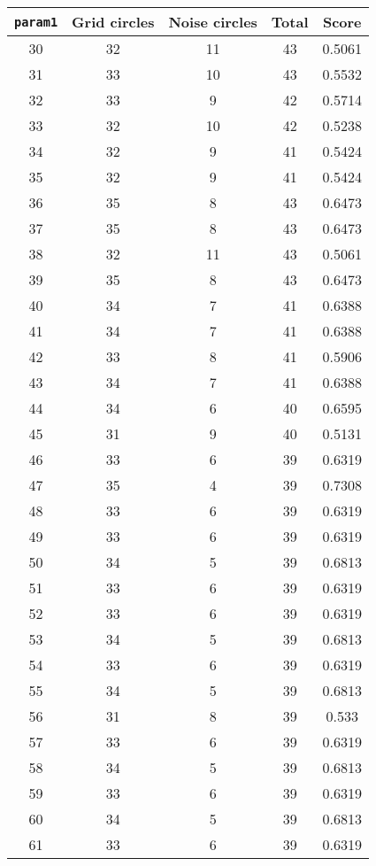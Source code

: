 \documentclass[letterpaper, 12pt]{article}
\begin{document}
\begin{longtable}{|c|c|c|c|c|}
\hline
\textbf{\texttt{param1}} & \textbf{Grid circles} & \textbf{Noise circles} & \textbf{Total} & \textbf{Score} \\
\hline
30 & 32 & 11 & 43 & 0.5061 \\
\hline
31 & 33 & 10 & 43 & 0.5532 \\
\hline
32 & 33 & 9 & 42 & 0.5714 \\
\hline
33 & 32 & 10 & 42 & 0.5238 \\
\hline
34 & 32 & 9 & 41 & 0.5424 \\
\hline
35 & 32 & 9 & 41 & 0.5424 \\
\hline
36 & 35 & 8 & 43 & 0.6473 \\
\hline
37 & 35 & 8 & 43 & 0.6473 \\
\hline
38 & 32 & 11 & 43 & 0.5061 \\
\hline
39 & 35 & 8 & 43 & 0.6473 \\
\hline
40 & 34 & 7 & 41 & 0.6388 \\
\hline
41 & 34 & 7 & 41 & 0.6388 \\
\hline
42 & 33 & 8 & 41 & 0.5906 \\
\hline
43 & 34 & 7 & 41 & 0.6388 \\
\hline
44 & 34 & 6 & 40 & 0.6595 \\
\hline
45 & 31 & 9 & 40 & 0.5131 \\
\hline
46 & 33 & 6 & 39 & 0.6319 \\
\hline
47 & 35 & 4 & 39 & 0.7308 \\
\hline
48 & 33 & 6 & 39 & 0.6319 \\
\hline
49 & 33 & 6 & 39 & 0.6319 \\
\hline
50 & 34 & 5 & 39 & 0.6813 \\
\hline
51 & 33 & 6 & 39 & 0.6319 \\
\hline
52 & 33 & 6 & 39 & 0.6319 \\
\hline
53 & 34 & 5 & 39 & 0.6813 \\
\hline
54 & 33 & 6 & 39 & 0.6319 \\
\hline
55 & 34 & 5 & 39 & 0.6813 \\
\hline
56 & 31 & 8 & 39 & 0.533 \\
\hline
57 & 33 & 6 & 39 & 0.6319 \\
\hline
58 & 34 & 5 & 39 & 0.6813 \\
\hline
59 & 33 & 6 & 39 & 0.6319 \\
\hline
60 & 34 & 5 & 39 & 0.6813 \\
\hline
61 & 33 & 6 & 39 & 0.6319 \\

\end{longtable}
\end{document}
